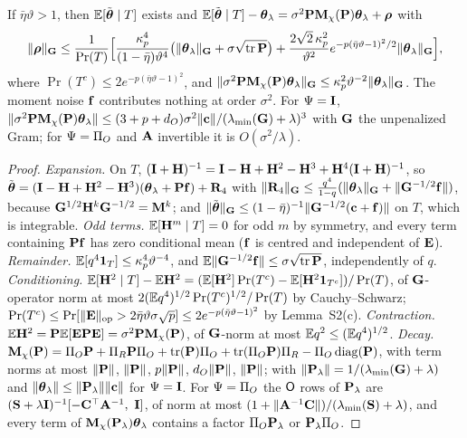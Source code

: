 \begin{theorem}\label{thm:S9}
If $\bar\eta\vartheta>1$, then $\mathbb{E}[\tilde{\boldsymbol{\theta}}\mid T]$ exists and $\mathbb{E}[\tilde{\boldsymbol{\theta}}\mid T]-\boldsymbol{\theta}_\lambda=\sigma^2\mathbf{P}\mathbf{M}_\chi(\mathbf{P})\boldsymbol{\theta}_\lambda+\boldsymbol\rho$ with
\[
  \|\boldsymbol\rho\|_{\mathbf{G}}\le\frac1{\Pr(T)}\Bigl[\frac{\kappa_p^4}{(1-\bar\eta)\vartheta^4}\bigl(\|\boldsymbol{\theta}_\lambda\|_{\mathbf{G}}+\sigma\sqrt{\operatorname{tr}\mathbf{P}}\bigr)+\frac{2\sqrt2\,\kappa_p^2}{\vartheta^2}e^{-p(\bar\eta\vartheta-1)^2/2}\|\boldsymbol{\theta}_\lambda\|_{\mathbf{G}}\Bigr],
\]
where $\Pr(T^c)\le2e^{-p(\bar\eta\vartheta-1)^2}$,
and $\|\sigma^2\mathbf{P}\mathbf{M}_\chi(\mathbf{P})\boldsymbol{\theta}_\lambda\|_{\mathbf{G}}\le\kappa_p^2\vartheta^{-2}\|\boldsymbol{\theta}_\lambda\|_{\mathbf{G}}$. The moment noise $\mathbf{f}$ contributes nothing at order $\sigma^2$. For $\Psi=\mathbf{I}$, $\|\sigma^2\mathbf{P}\mathbf{M}_\chi(\mathbf{P})\boldsymbol{\theta}_\lambda\|\le(3+p+d_O)\sigma^2\|\mathbf{c}\|/(\lambda_{\min}(\mathbf{G})+\lambda)^3$ with $\mathbf{G}$ the unpenalized Gram; for $\Psi=\Pi_O$ and $\mathbf{A}$ invertible it is $O(\sigma^2/\lambda)$.
\end{theorem}
\begin{proof}
\emph{Expansion.} On $T$, $(\mathbf{I}+\mathbf{H})^{-1}=\mathbf{I}-\mathbf{H}+\mathbf{H}^2-\mathbf{H}^3+\mathbf{H}^4(\mathbf{I}+\mathbf{H})^{-1}$, so $\tilde{\boldsymbol{\theta}}=(\mathbf{I}-\mathbf{H}+\mathbf{H}^2-\mathbf{H}^3)(\boldsymbol{\theta}_\lambda+\mathbf{P}\mathbf{f})+\mathbf R_4$ with $\|\mathbf R_4\|_{\mathbf{G}}\le\tfrac{q^4}{1-q}(\|\boldsymbol{\theta}_\lambda\|_{\mathbf{G}}+\|\mathbf{G}^{-1/2}\mathbf{f}\|)$, because $\mathbf{G}^{1/2}\mathbf{H}^k\mathbf{G}^{-1/2}=\mathbf{M}^k$; and $\|\tilde{\boldsymbol{\theta}}\|_{\mathbf{G}}\le(1-\bar\eta)^{-1}\|\mathbf{G}^{-1/2}(\mathbf{c}+\mathbf{f})\|$ on $T$, which is integrable. \emph{Odd terms.} $\mathbb{E}[\mathbf{H}^m\mid T]=0$ for odd $m$ by symmetry, and every term containing $\mathbf{P}\mathbf{f}$ has zero conditional mean ($\mathbf{f}$ is centred and independent of $\mathbf{E}$). \emph{Remainder.} $\mathbb{E}[q^4\mathbf 1_T]\le\kappa_p^4\vartheta^{-4}$, and $\mathbb{E}\|\mathbf{G}^{-1/2}\mathbf{f}\|\le\sigma\sqrt{\operatorname{tr}\mathbf{P}}$, independently of $q$. \emph{Conditioning.} $\mathbb{E}[\mathbf{H}^2\mid T]-\mathbb{E}\mathbf{H}^2=(\mathbb{E}[\mathbf{H}^2]\Pr(T^c)-\mathbb{E}[\mathbf{H}^2\mathbf 1_{T^c}])/\Pr(T)$, of $\mathbf{G}$-operator norm at most $2(\mathbb{E} q^4)^{1/2}\Pr(T^c)^{1/2}/\Pr(T)$ by Cauchy--Schwarz; $\Pr(T^c)\le\Pr[\|\mathbf{E}\|_{\mathrm{op}}>2\bar\eta\vartheta\sigma\sqrt p]\le2e^{-p(\bar\eta\vartheta-1)^2}$ by Lemma~S2(c). \emph{Contraction.} $\mathbb{E}\mathbf{H}^2=\mathbf{P}\mathbb{E}[\mathbf{E}\mathbf{P}\mathbf{E}]=\sigma^2\mathbf{P}\mathbf{M}_\chi(\mathbf{P})$, of $\mathbf{G}$-norm at most $\mathbb{E} q^2\le(\mathbb{E} q^4)^{1/2}$. \emph{Decay.} $\mathbf{M}_\chi(\mathbf{P})=\Pi_O\mathbf{P}+\Pi_R\mathbf{P}\Pi_O+\operatorname{tr}(\mathbf{P})\Pi_O+\operatorname{tr}(\Pi_O\mathbf{P})\Pi_R-\Pi_O\operatorname{diag}(\mathbf{P})$, with term norms at most $\|\mathbf{P}\|$, $\|\mathbf{P}\|$, $p\|\mathbf{P}\|$, $d_O\|\mathbf{P}\|$, $\|\mathbf{P}\|$; with $\|\mathbf{P}_\lambda\|=1/(\lambda_{\min}(\mathbf{G})+\lambda)$ and $\|\boldsymbol{\theta}_\lambda\|\le\|\mathbf{P}_\lambda\|\|\mathbf{c}\|$ for $\Psi=\mathbf{I}$. For $\Psi=\Pi_O$ the $\mathsf{O}$ rows of $\mathbf{P}_\lambda$ are $(\bS+\lambda\bI)^{-1}[-\bC^\top\bA^{-1},\ \bI]$, of norm at most $(1+\|\mathbf{A}^{-1}\mathbf{C}\|)/(\lambda_{\min}(\mathbf{S})+\lambda)$, and every term of $\mathbf{M}_\chi(\mathbf{P}_\lambda)\boldsymbol{\theta}_\lambda$ contains a factor $\Pi_O\mathbf{P}_\lambda$ or $\mathbf{P}_\lambda\Pi_O$.
\end{proof}
